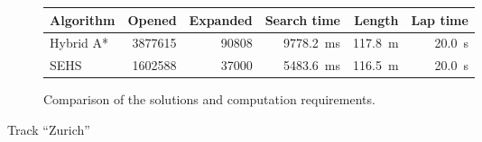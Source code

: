 \begin{figure}[!tbp]
	\vspace{0.75cm}
	
	\begin{subfigure}[t]{\textwidth}
		\centering
		\begin{tabular}{l r r r r r}%
			\toprule
			Algorithm & Opened & Expanded & Search time & Length & Lap time \\
			\midrule
			Hybrid A* & \num{3877615} & \num{90808} & \SI{9778.2}{\milli\second} & \SI{117.8}{\meter} & \SI{20.0}{\second} \\
			\gls*{SEHS} & \bftab \num{1602588} & \bftab \num{37000} & \bftab \SI{5483.6}{\milli\second} & \SI{116.5}{\meter} & \SI{20.0}{\second} \\
			\bottomrule
		\end{tabular}
		\caption{Comparison of the solutions and computation requirements.}
		\label{table:zurich}
	\end{subfigure}
	
	\vspace{0.75cm}

	\caption{Track ``Zurich''}
	\label{fig:zurich}
\end{figure}

